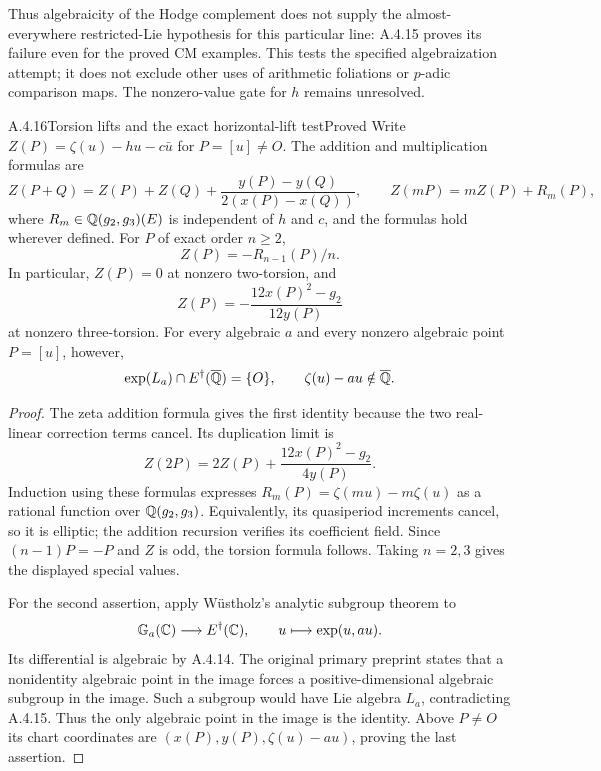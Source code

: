 Thus algebraicity of the Hodge complement does not supply the almost-everywhere restricted-Lie hypothesis for this particular line: A.4.15 proves its failure even for the proved CM examples. This tests the specified algebraization attempt; it does not exclude other uses of arithmetic foliations or $p$-adic comparison maps. The nonzero-value gate for $h$ remains unresolved.

\begin{result}{A.4.16}{Torsion lifts and the exact horizontal-lift test}{Proved}
Write $Z(P)=\zeta(u)-hu-c\bar u$ for $P=[u]\ne O$. The addition and multiplication formulas are
\[
 Z(P+Q)=Z(P)+Z(Q)+\frac{y(P)-y(Q)}{2(x(P)-x(Q))},
 \qquad Z(mP)=mZ(P)+R_m(P),
\]
where $R_m\in\mathbb Q(g_2,g_3)(E)$ is independent of $h$ and $c$, and the formulas hold wherever defined. For $P$ of exact order $n\ge2$,
\[
 Z(P)=-R_{n-1}(P)/n.
\]
In particular, $Z(P)=0$ at nonzero two-torsion, and
\[
 Z(P)=-\frac{12x(P)^2-g_2}{12y(P)}
\]
at nonzero three-torsion. For every algebraic $a$ and every nonzero algebraic point $P=[u]$, however,
\[
 \exp(L_a)\cap E^\dagger(\overline{\mathbb Q})=\{O\},\qquad
 \zeta(u)-au\notin\overline{\mathbb Q}.
\]
\end{result}
\begin{proof}
The zeta addition formula gives the first identity because the two real-linear correction terms cancel. Its duplication limit is
\[
 Z(2P)=2Z(P)+\frac{12x(P)^2-g_2}{4y(P)}.
\]
Induction using these formulas expresses $R_m(P)=\zeta(mu)-m\zeta(u)$ as a rational function over $\mathbb Q(g_2,g_3)$. Equivalently, its quasiperiod increments cancel, so it is elliptic; the addition recursion verifies its coefficient field. Since $(n-1)P=-P$ and $Z$ is odd, the torsion formula follows. Taking $n=2,3$ gives the displayed special values.

For the second assertion, apply W\"ustholz's analytic subgroup theorem to
\[
 \mathbb G_a(\mathbb C)\longrightarrow E^\dagger(\mathbb C),\qquad
 u\longmapsto\exp(u,au).
\]
Its differential is algebraic by A.4.14. The original primary preprint \cite[Hauptsatz and Bemerkung 2, printed p.3]{EllWustholz1984} states that a nonidentity algebraic point in the image forces a positive-dimensional algebraic subgroup in the image. Such a subgroup would have Lie algebra $L_a$, contradicting A.4.15. Thus the only algebraic point in the image is the identity. Above $P\ne O$ its chart coordinates are $(x(P),y(P),\zeta(u)-au)$, proving the last assertion.
\end{proof}

